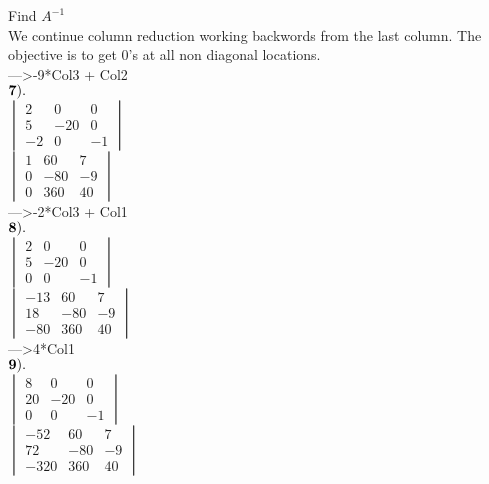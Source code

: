 \documentclass[]{article}
\begin{document}
Find \(A^{-1}\)\\
 We continue column reduction working backwords from the last column.
The objective is to get 0's at all non diagonal locations.\\

---\textgreater{}-9*Col3 + Col2\\

\(\bold{7).}\)\\

\(\begin{vmatrix} 2 & 0 & 0\\ 5 & -20 & 0\\ -2 & 0 & -1 \end{vmatrix}\)\\

\(\begin{vmatrix} 1 & 60 & 7\\ 0 & -80 & -9 \\ 0 & 360 & 40 \end{vmatrix}\)\\

---\textgreater{}-2*Col3 + Col1\\

\(\bold{8).}\)\\

\(\begin{vmatrix} 2 & 0 & 0\\ 5 & -20 & 0\\ 0 & 0 & -1 \end{vmatrix}\)\\

\(\begin{vmatrix} -13 & 60 & 7\\ 18 & -80 & -9 \\ -80 & 360 & 40 \end{vmatrix}\)\\

---\textgreater{}4*Col1\\

\(\bold{9).}\)\\

\(\begin{vmatrix} 8 & 0 & 0\\ 20 & -20 & 0\\ 0 & 0 & -1 \end{vmatrix}\)\\

\(\begin{vmatrix} -52 & 60 & 7\\ 72 & -80 & -9 \\ -320 & 360 & 40 \end{vmatrix}\)\\
\end{document}
